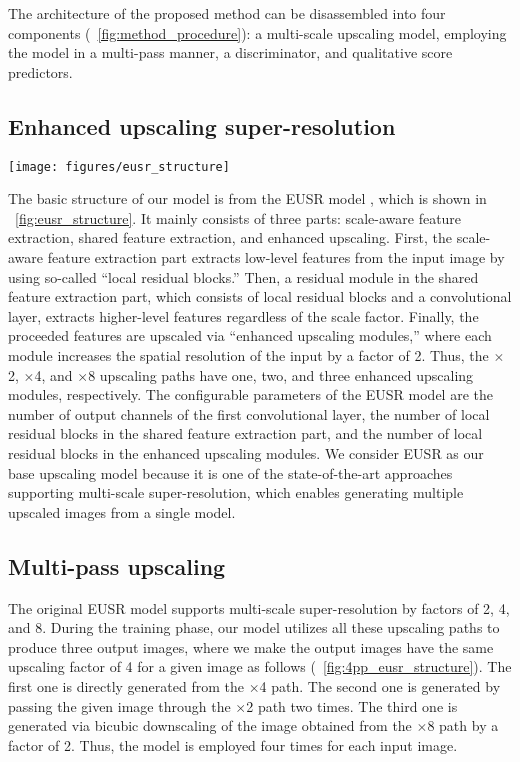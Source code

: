 \documentclass[runningheads]{llncs}
\begin{document}
The architecture of the proposed method can be disassembled into four components (\figurename~\ref{fig:method_procedure}): a multi-scale upscaling model, employing the model in a multi-pass manner, a discriminator, and qualitative score predictors.

\subsection{Enhanced upscaling super-resolution}
\label{sec:eusr}

\begin{figure*}[t]
	\centering
	\texttt{[image: figures/eusr\_structure]}
	\caption{Structure of the EUSR model \cite{kim2018deep}.}
	\label{fig:eusr_structure}
\end{figure*}

The basic structure of our model is from the EUSR model \cite{kim2018deep}, which is shown in \figurename~\ref{fig:eusr_structure}.
It mainly consists of three parts: scale-aware feature extraction, shared feature extraction, and enhanced upscaling.
First, the scale-aware feature extraction part extracts low-level features from the input image by using so-called ``local residual blocks.''
Then, a residual module in the shared feature extraction part, which consists of local residual blocks and a convolutional layer, extracts higher-level features regardless of the scale factor.
Finally, the proceeded features are upscaled via ``enhanced upscaling modules,'' where each module increases the spatial resolution of the input by a factor of 2.
Thus, the $\times$2, $\times$4, and $\times$8 upscaling paths have one, two, and three enhanced upscaling modules, respectively.
The configurable parameters of the EUSR model are the number of output channels of the first convolutional layer, the number of local residual blocks in the shared feature extraction part, and the number of local residual blocks in the enhanced upscaling modules.
We consider EUSR as our base upscaling model because it is one of the state-of-the-art approaches supporting multi-scale super-resolution, which enables generating multiple upscaled images from a single model.

\subsection{Multi-pass upscaling}
\label{sec:multipass_upscaling}

The original EUSR model supports multi-scale super-resolution by factors of 2, 4, and 8.
During the training phase, our model utilizes all these upscaling paths to produce three output images, where we make the output images have the same upscaling factor of 4 for a given image as follows (\figurename~\ref{fig:4pp_eusr_structure}).
The first one is directly generated from the $\times$4 path.
The second one is generated by passing the given image through the $\times$2 path two times.
The third one is generated via bicubic downscaling of the image obtained from the $\times$8 path by a factor of 2.
Thus, the model is employed four times for each input image.
\end{document}
